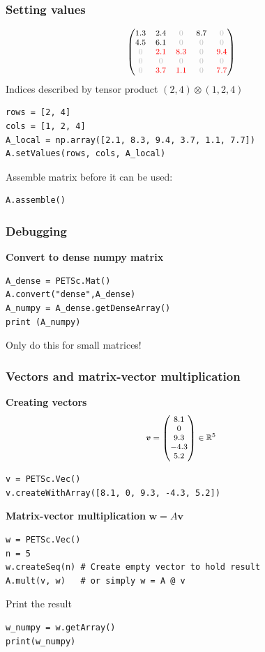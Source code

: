 \documentclass{beamer}
\renewcommand{\vec}[1]{\boldsymbol{#1}}
\begin{document}
\begin{frame}[fragile]
  \frametitle{Setting values}
$$
\footnotesize{
\begin{pmatrix}
1.3 & 2.4 & \textcolor{lightgray}{0} & 8.7 & \textcolor{lightgray}{0} \\
4.5 & 6.1 & \textcolor{lightgray}{0} & \textcolor{lightgray}{0} & \textcolor{lightgray}{0} \\
\textcolor{lightgray}{0} & \textcolor{red}{2.1} & \textcolor{red}{8.3} & \textcolor{lightgray}{0} & \textcolor{red}{9.4} \\
\textcolor{lightgray}{0} & \textcolor{lightgray}{0} & \textcolor{lightgray}{0} & \textcolor{lightgray}{0} & \textcolor{lightgray}{0} \\
\textcolor{lightgray}{0} & \textcolor{red}{3.7} & \textcolor{red}{1.1} & \textcolor{lightgray}{0} & \textcolor{red}{7.7}
\end{pmatrix}}
$$
Indices described by tensor product $(2,4)\otimes(1,2,4)$
\begin{lstlisting}
rows = [2, 4]
cols = [1, 2, 4]
A_local = np.array([2.1, 8.3, 9.4, 3.7, 1.1, 7.7])
A.setValues(rows, cols, A_local)
\end{lstlisting}
Assemble matrix before it can be used:
\begin{lstlisting}
A.assemble()
\end{lstlisting}
\end{frame}


\begin{frame}[fragile]
  \frametitle{Debugging}
\textbf{Convert to dense numpy matrix}
\begin{lstlisting}
A_dense = PETSc.Mat()
A.convert("dense",A_dense)
A_numpy = A_dense.getDenseArray()
print (A_numpy)
\end{lstlisting}
Only do this for small matrices!
\end{frame}


\begin{frame}[fragile]
  \frametitle{Vectors and matrix-vector multiplication}
  \textbf{Creating vectors}
$$
\footnotesize{
\boldsymbol{v} = \begin{pmatrix}
8.1\\0\\9.3\\-4.3\\5.2
\end{pmatrix}\in\mathbb{R}^5}
$$
\begin{lstlisting}
v = PETSc.Vec()
v.createWithArray([8.1, 0, 9.3, -4.3, 5.2])
\end{lstlisting}
\textbf{Matrix-vector multiplication} $\vec{w} = A\vec{v}$
\begin{lstlisting}
w = PETSc.Vec()
n = 5
w.createSeq(n) # Create empty vector to hold result
A.mult(v, w)   # or simply w = A @ v
\end{lstlisting}
Print the result
\begin{lstlisting}
w_numpy = w.getArray()
print(w_numpy)
\end{lstlisting}
\end{frame}
\end{document}
